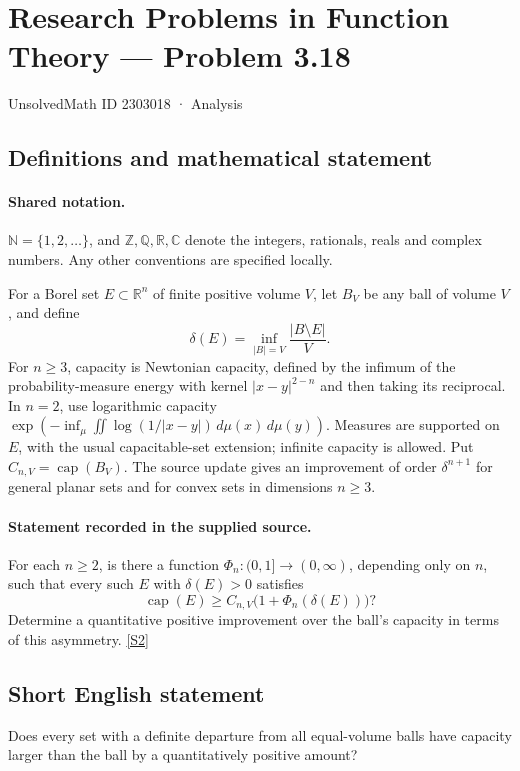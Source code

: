\documentclass[11pt]{article}
\newcommand{\sref}[2]{\hyperlink{source:#1:#2}{[S#2]}}
\begin{document}
\setcounter{section}{2303017}
\section{Research Problems in Function Theory — Problem 3.18}\label{2303018}
{\small\sffamily UnsolvedMath ID 2303018 · Analysis}
\subsection{Definitions and mathematical statement}

\paragraph{Shared notation.}$\mathbb N=\{1,2,\ldots\}$, and $\mathbb Z,\mathbb Q,\mathbb R,\mathbb C$ denote the integers, rationals, reals and complex numbers. Any other conventions are specified locally.


For a Borel set $E\subset\mathbb R^n$ of finite positive volume $V$, let $B_V$ be any ball of volume $V$, and define
\[\delta(E)=\inf_{|B|=V}\frac{|B\setminus E|}{V}.\]
For $n\geq3$, capacity is Newtonian capacity, defined by the infimum of the probability-measure energy with kernel $|x-y|^{2-n}$ and then taking its reciprocal. In $n=2$, use logarithmic capacity $\exp(-\inf_\mu\iint\log(1/|x-y|)\,d\mu(x)\,d\mu(y))$. Measures are supported on $E$, with the usual capacitable-set extension; infinite capacity is allowed. Put $C_{n,V}=\operatorname{cap}(B_V)$.
The source update gives an improvement of order $\delta^{n+1}$ for general planar sets and for convex sets in dimensions $n\geq3$.
\paragraph{Statement recorded in the supplied source.}
For each $n\geq2$, is there a function $\Phi_n:(0,1]\to(0,\infty)$, depending only on $n$, such that every such $E$ with $\delta(E)>0$ satisfies
\[\operatorname{cap}(E)\geq C_{n,V}\bigl(1+\Phi_n(\delta(E))\bigr)?\]
Determine a quantitative positive improvement over the ball's capacity in terms of this asymmetry. \sref{2303018}{2}
\subsection{Short English statement}
Does every set with a definite departure from all equal-volume balls have capacity larger than the ball by a quantitatively positive amount?
\end{document}
